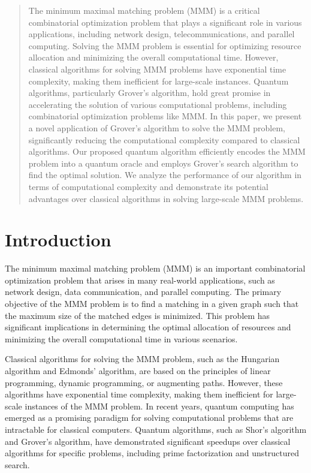 \begin{abstract}
The minimum maximal matching problem (MMM) is a critical combinatorial optimization problem that plays a significant role in various applications, including network design, telecommunications, and parallel computing. Solving the MMM problem is essential for optimizing resource allocation and minimizing the overall computational time. However, classical algorithms for solving MMM problems have exponential time complexity, making them inefficient for large-scale instances. Quantum algorithms, particularly Grover's algorithm, hold great promise in accelerating the solution of various computational problems, including combinatorial optimization problems like MMM. In this paper, we present a novel application of Grover's algorithm to solve the MMM problem, significantly reducing the computational complexity compared to classical algorithms. Our proposed quantum algorithm efficiently encodes the MMM problem into a quantum oracle and employs Grover's search algorithm to find the optimal solution. We analyze the performance of our algorithm in terms of computational complexity and demonstrate its potential advantages over classical algorithms in solving large-scale MMM problems.

\end{abstract}

\section{Introduction}

The minimum maximal matching problem (MMM) is an important combinatorial optimization problem that arises in many real-world applications, such as network design, data communication, and parallel computing. The primary objective of the MMM problem is to find a matching in a given graph such that the maximum size of the matched edges is minimized. This problem has significant implications in determining the optimal allocation of resources and minimizing the overall computational time in various scenarios.

Classical algorithms for solving the MMM problem, such as the Hungarian algorithm and Edmonds' algorithm, are based on the principles of linear programming, dynamic programming, or augmenting paths. However, these algorithms have exponential time complexity, making them inefficient for large-scale instances of the MMM problem. In recent years, quantum computing has emerged as a promising paradigm for solving computational problems that are intractable for classical computers. Quantum algorithms, such as Shor's algorithm and Grover's algorithm, have demonstrated significant speedups over classical algorithms for specific problems, including prime factorization and unstructured search.

